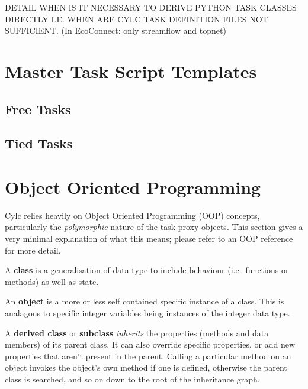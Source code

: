 \documentclass[11pt,a4paper]{article}
\begin{document}
DETAIL WHEN IS IT NECESSARY TO DERIVE PYTHON TASK CLASSES DIRECTLY
I.E. WHEN ARE CYLC TASK DEFINITION FILES NOT SUFFICIENT.
(In EcoConnect: only streamflow and topnet)

\pagebreak
\section{Master Task Script Templates}
\label{MasterTaskScriptTemplates}



\lstset{language=bash}

\pagebreak
\subsection{Free Tasks}


\pagebreak
\subsection{Tied Tasks}


\appendix

\pagebreak
\section{Object Oriented Programming}
\label{ObjectOrientedProgramming}

Cylc relies heavily on Object Oriented Programming (OOP) concepts,
particularly the {\em polymorphic} nature of the task proxy objects.
This section gives a very minimal explanation of what this means;
please refer to an OOP reference for more detail.

A {\bf class} is a generalisation of data type to include behaviour
(i.e.\ functions or methods) as well as state. 


An {\bf object} is a more or less self contained specific instance
of a class. This is analagous to specific integer variables being 
instances of the integer data type.

A {\bf derived class} or {\bf subclass} {\em inherits} the properties
(methods and data members) of its parent class. It can also override
specific properties, or add new properties that aren't present in the
parent. Calling a particular method on an object invokes the object's
own method if one is defined, otherwise the parent class is searched,
and so on down to the root of the inheritance graph. 
\end{document}
